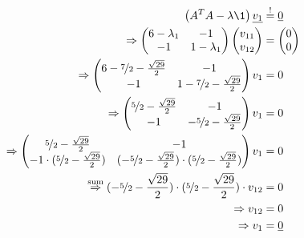 \begin{equation}\begin{split}
	\left(A^TA-\lambda\1\right)\underline{v_1} &\stackrel{!}{=} \underline{0}\\
	\Rightarrow
	\begin{pmatrix}
		6-\lambda_1&-1\\-1&1-\lambda_1
	\end{pmatrix}
	\begin{pmatrix}
		v_{11}\\v_{12}
	\end{pmatrix}
	&=
	\begin{pmatrix}
		0\\0
	\end{pmatrix}\\
	\Rightarrow
	\begin{pmatrix}
		6-\nicefrac{7}{2} - \frac{\sqrt{29}}{2} & -1\\
		-1 & 1 -\nicefrac{7}{2} - \frac{\sqrt{29}}{2}
	\end{pmatrix}
	v_1
	&=
	0\\
	\Rightarrow
	\begin{pmatrix}
		\nicefrac{5}{2} - \frac{\sqrt{29}}{2} & -1\\
		-1 & -\nicefrac{5}{2} - \frac{\sqrt{29}}{2}
	\end{pmatrix}
	v_1
	&=
	0\\
	\Rightarrow
	\begin{pmatrix}
		\nicefrac{5}{2} - \frac{\sqrt{29}}{2} & -1\\
		-1 \cdot (\nicefrac{5}{2} - \frac{\sqrt{29}}{2}) & (-\nicefrac{5}{2} - \frac{\sqrt{29}}{2})\cdot(\nicefrac{5}{2} - \frac{\sqrt{29}}{2})
	\end{pmatrix}
	v_1
	&=
	0\\
	\stackrel{\text{sum}}{\Rightarrow}
	(-\nicefrac{5}{2} - \frac{\sqrt{29}}{2})\cdot(\nicefrac{5}{2} - \frac{\sqrt{29}}{2}) \cdot v_{12} &= 0\\
	\Rightarrow v_{12} &= 0\\
	\Rightarrow v_1 &= \underline{0}
\end{split}\end{equation}
















